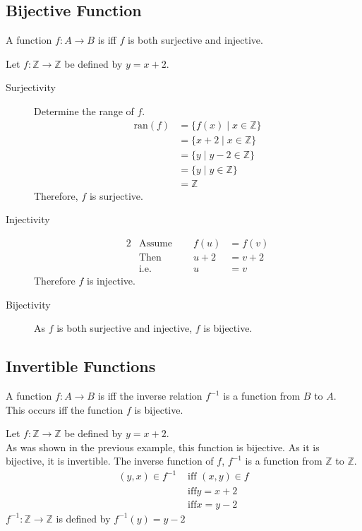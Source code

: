 \documentclass[../notes.tex]{subfiles}
\begin{document}
			\subsection{Bijective Function}
				\begin{definition}
					A function $f: A \rightarrow B$ is  iff $f$ is both surjective and injective.
				\end{definition}
				\begin{example}
					Let $f: \mathbb{Z} \rightarrow \mathbb{Z}$ be defined by $y = x + 2$.
					\begin{description}
						\item[Surjectivity] Determine the range of $f$.
							\begin{align*}
								\mathrm{ran}(f) &= \{f(x) \mid x \in \mathbb{Z}\}\\
								&= \{x + 2 \mid x \in \mathbb{Z}\}\\
								&= \{y \mid y - 2 \in \mathbb{Z}\}\tag*{$x = y - 2$}\\
								&= \{y \mid y \in \mathbb{Z}\}\\
								&= \mathbb{Z}
							\end{align*}
							Therefore, $f$ is surjective.
						\item[Injectivity]
							\begin{alignat*}{2}
								&\text{Assume } \quad &f(u) &= f(v)\\
								&\text{Then } &u + 2 &= v + 2\\
								&\text{i.e.} &u &= v
							\end{alignat*}
							Therefore $f$ is injective.
						\item[Bijectivity] As $f$ is both surjective and injective, $f$ is bijective.
					\end{description}
				\end{example}
			\pagebreak
			\subsection{Invertible Functions}
				\begin{definition}
					A function $f: A \rightarrow B$ is  iff the inverse relation $f^{-1}$ is a function from $B$ to $A$.\\
					This occurs iff the function $f$ is bijective.
				\end{definition}
				\begin{example}
					Let $f: \mathbb{Z} \rightarrow \mathbb{Z}$ be defined by $y = x + 2$.\\
					As was shown in the previous example, this function is bijective. As it is bijective, it is invertible. The inverse function of $f$, $f^{-1}$ is a function from $\mathbb{Z}$ to $\mathbb{Z}$.
					\begin{align*}
						(y, x) \in f^{-1} &\text{ iff } (x, y) \in f\\
						& \text{ iff} y = x + 2\\
						& \text{ iff} x = y - 2
					\end{align*}
					$f^{-1}: \mathbb{Z} \rightarrow \mathbb{Z}$ is defined by $f^{-1}(y) = y - 2$
				\end{example}
\end{document}
